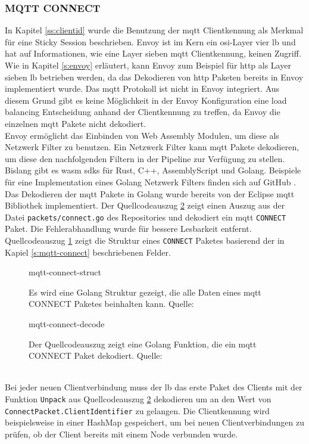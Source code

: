 \subsubsection{MQTT CONNECT}
In Kapitel \ref{ss:clientid} wurde die Benutzung der \ac{mqtt} Clientkennung als Merkmal für eine Sticky Session beschrieben. Envoy ist im Kern ein \ac{osi}-Layer vier \acl{lb} und hat auf Informationen, wie eine Layer sieben \ac{mqtt} Clientkennung, keinen Zugriff. Wie in Kapitel \ref{s:envoy} erläutert, kann Envoy zum Beispiel für \ac{http} als Layer sieben \ac{lb} betrieben werden, da das Dekodieren von \ac{http} Paketen bereits in Envoy implementiert wurde.
Das \ac{mqtt} Protokoll ist nicht in Envoy integriert. Aus diesem Grund gibt es keine Möglichkeit in der Envoy Konfiguration eine load balancing Entscheidung anhand der Clientkennung zu treffen, da Envoy die einzelnen \ac{mqtt} Pakete nicht dekodiert.
\\
Envoy ermöglicht das Einbinden von Web Assembly Modulen, um diese als Netzwerk Filter zu benutzen. Ein Netzwerk Filter kann \ac{mqtt} Pakete dekodieren, um diese den nachfolgenden Filtern in der Pipeline zur Verfügung zu stellen. Bislang gibt es \ac{wasm} \acp{sdk} für Rust, C++, AssemblyScript und Golang. \cite{sebastianHowWriteWASM} Beispiele für eine Implementation eines Golang Netzwerk Filters finden sich auf GitHub \cite{TetratelabsProxywasmgosdk2021}.
\\
Das Dekodieren der \ac{mqtt} Pakete in Golang wurde bereits von der Eclipse \ac{mqtt} Bibliothek \cite{EclipsePahoMqtt2021} implementiert.
Der Quellcodeauszug \ref{code:mqtt-connect-decode} zeigt einen Auszug aus der Datei \verb|packets/connect.go| des Repositories und dekodiert ein \ac{mqtt} \verb|CONNECT| Paket. Die Fehlerabhandlung wurde für bessere Lesbarkeit entfernt. Quellcodeauszug \ref{code:mqtt-connect-struct} zeigt die Struktur eines \verb|CONNECT| Paketes basierend der in Kapiel \ref{s:mqtt-connect} beschriebenen Felder.
\begin{figure}
    {mqtt-connect-struct}
    \caption{Es wird eine Golang Struktur gezeigt, die alle Daten eines \ac{mqtt} CONNECT Paketes beinhalten kann. Quelle: \cite{EclipsePahoMqtt2021}}
    \label{code:mqtt-connect-struct}
\end{figure}
\begin{figure}
    {mqtt-connect-decode}
    \caption{Der Quellcodeauszug zeigt eine Golang Funktion, die ein \ac{mqtt} CONNECT Paket dekodiert. Quelle: \cite{EclipsePahoMqtt2021}}
    \label{code:mqtt-connect-decode}
\end{figure}
\\
Bei jeder neuen Clientverbindung muss der \acl{lb} das erste Paket des Clients mit der Funktion \verb|Unpack| aus Quellcodeauszug \ref{code:mqtt-connect-decode} dekodieren um an den Wert von\newline
\verb|ConnectPacket.ClientIdentifier| zu gelangen.
Die Clientkennung wird beispielsweise in einer HashMap gespeichert, um bei neuen Clientverbindungen zu prüfen, ob der Client bereits mit einem Node verbunden wurde.

